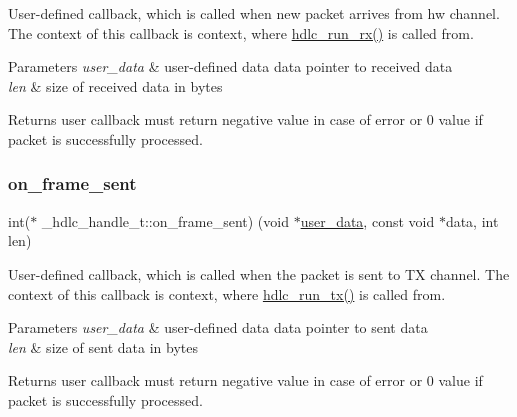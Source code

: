 User-\/defined callback, which is called when new packet arrives from hw channel. The context of this callback is context, where \hyperlink{group__HDLC__API_ga911a3f1cb32dd6cadd00223e0097642c}{hdlc\+\_\+run\+\_\+rx()} is called from. 
\begin{DoxyParams}{Parameters}
{\em user\+\_\+data} & user-\/defined data  data pointer to received data \\
\hline
{\em len} & size of received data in bytes \\
\hline
\end{DoxyParams}
\begin{DoxyReturn}{Returns}
user callback must return negative value in case of error or 0 value if packet is successfully processed. 
\end{DoxyReturn}
\mbox{\label{struct__hdlc__handle__t_a9aba360df83395af01ff448bca03e259}} 
\subsubsection{\texorpdfstring{on\+\_\+frame\+\_\+sent}{on\_frame\_sent}}
{\footnotesize\ttfamily int($\ast$ \+\_\+hdlc\+\_\+handle\+\_\+t\+::on\+\_\+frame\+\_\+sent) (void $\ast$\hyperlink{struct__hdlc__handle__t_a41563ee7b01240a582d2f9ce9a632da8}{user\+\_\+data}, const void $\ast$data, int len)}

User-\/defined callback, which is called when the packet is sent to TX channel. The context of this callback is context, where \hyperlink{group__HDLC__API_gae31d921043b4f175603114c206b6b829}{hdlc\+\_\+run\+\_\+tx()} is called from. 
\begin{DoxyParams}{Parameters}
{\em user\+\_\+data} & user-\/defined data  data pointer to sent data \\
\hline
{\em len} & size of sent data in bytes \\
\hline
\end{DoxyParams}
\begin{DoxyReturn}{Returns}
user callback must return negative value in case of error or 0 value if packet is successfully processed. 
\end{DoxyReturn}
\mbox{\label{struct__hdlc__handle__t_a4736ab7a858df79cf74bd19e6dbacb13}} 
